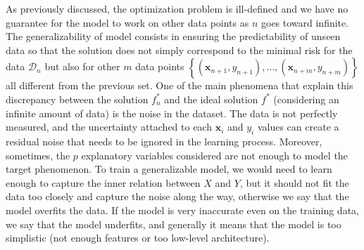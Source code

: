 \documentclass[main]{subfiles}
\begin{document}
As previously discussed, the optimization problem is ill-defined and we have no guarantee for the model to work on other data points as $n$ goes toward infinite. The generalizability of model consists in ensuring the predictability of unseen data so that the solution does not simply correspond to the minimal risk for the data $\mathcal{D}_{n}$ but also for other $m$ data points $\left\{(\mathbf{x}_{n+1},y_{n+1}),\ldots,(\mathbf{x}_{n+m},y_{n+m})\right\}$ all different from the previous set. One of the main phenomena that explain this discrepancy between the solution $f_n^*$ and the ideal solution $f^*$ (considering an infinite amount of data) is the noise in the dataset. The data is not perfectly measured, and the uncertainty attached to each $\mathbf{x}_i$ and $y_i$ values can create a residual noise that needs to be ignored in the learning process. Moreover, sometimes, the $p$ explanatory variables considered are not enough to model the target phenomenon. To train a generalizable model, we would need to learn enough to capture the inner relation between $X$ and $Y$, but it should not fit the data too closely and capture the noise along the way, otherwise we say that the model overfits the data. If the model is very inaccurate even on the training data, we say that the model underfits, and generally it means that the model is too simplistic (not enough features or too low-level architecture). 
\end{document}
